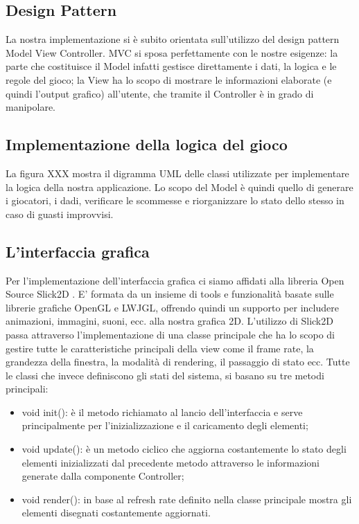 \documentclass{llncs}
\begin{document}
		\subsection{Design Pattern}
			La nostra implementazione si è subito orientata sull'utilizzo del design pattern Model View Controller\cite{MVC}. MVC si sposa perfettamente con le nostre esigenze: la parte che costituisce il Model infatti gestisce direttamente i dati, la logica e le regole del gioco; la View ha lo scopo di mostrare le informazioni elaborate (e quindi l'output grafico) all'utente, che tramite il Controller è in grado di manipolare.
			
		\subsection{Implementazione della logica del gioco}
			La figura XXX mostra il digramma UML delle classi utilizzate per implementare la logica della nostra applicazione. Lo scopo del Model è quindi quello di generare i giocatori, i dadi, verificare le scommesse e riorganizzare lo stato dello stesso in caso di guasti improvvisi.
			
		\subsection{L'interfaccia grafica}
			Per l'implementazione dell'interfaccia grafica ci siamo affidati alla libreria Open Source Slick2D \cite{Slick}. E' formata da un insieme di tools e funzionalità basate sulle librerie grafiche OpenGL e LWJGL, offrendo quindi un supporto per includere animazioni, immagini, suoni, ecc. alla nostra grafica 2D. L'utilizzo di Slick2D passa attraverso l'implementazione di una classe principale che ha lo scopo di gestire tutte le caratteristiche principali della view come il frame rate, la grandezza della finestra, la modalità di rendering, il passaggio di stato ecc. Tutte le classi che invece definiscono gli stati del sistema, si basano su tre metodi principali: 
				\begin{itemize}
					\item void init(): è il metodo richiamato al lancio dell'interfaccia e serve principalmente per l'inizializzazione e il caricamento degli elementi;
					\item void update(): è un metodo ciclico che aggiorna costantemente lo stato degli elementi inizializzati dal precedente metodo attraverso le informazioni generate dalla componente Controller;
					\item void render(): in base al refresh rate definito nella classe principale mostra gli elementi disegnati costantemente aggiornati.
				\end{itemize}
\end{document}
